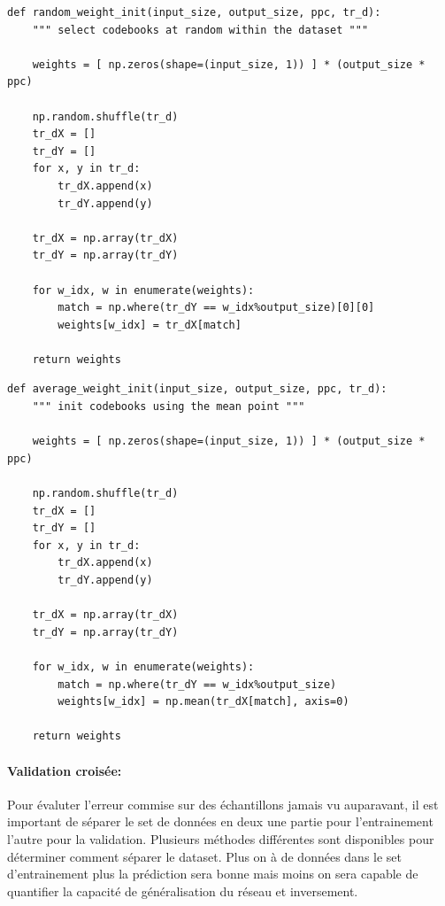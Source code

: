\documentclass[11pt]{article}
\begin{document}
\begin{lstlisting}
def random_weight_init(input_size, output_size, ppc, tr_d):
    """ select codebooks at random within the dataset """

    weights = [ np.zeros(shape=(input_size, 1)) ] * (output_size * ppc)

    np.random.shuffle(tr_d)
    tr_dX = []
    tr_dY = []
    for x, y in tr_d:
        tr_dX.append(x)
        tr_dY.append(y)

    tr_dX = np.array(tr_dX)
    tr_dY = np.array(tr_dY)

    for w_idx, w in enumerate(weights):
        match = np.where(tr_dY == w_idx%output_size)[0][0]
        weights[w_idx] = tr_dX[match]

    return weights
\end{lstlisting}

\begin{lstlisting}
def average_weight_init(input_size, output_size, ppc, tr_d):
    """ init codebooks using the mean point """

    weights = [ np.zeros(shape=(input_size, 1)) ] * (output_size * ppc)

    np.random.shuffle(tr_d)
    tr_dX = []
    tr_dY = []
    for x, y in tr_d:
        tr_dX.append(x)
        tr_dY.append(y)

    tr_dX = np.array(tr_dX)
    tr_dY = np.array(tr_dY)

    for w_idx, w in enumerate(weights):
        match = np.where(tr_dY == w_idx%output_size)
        weights[w_idx] = np.mean(tr_dX[match], axis=0)

    return weights
\end{lstlisting}
\newpage



\paragraph{Validation crois\'ee:} Pour \'evaluter l'erreur commise sur des
\'echantillons jamais vu auparavant, il est
important de s\'eparer le set de donn\'ees en deux une partie pour l'entrainement
l'autre pour la validation. Plusieurs m\'ethodes diff\'erentes sont disponibles
pour d\'eterminer comment s\'eparer le dataset. Plus on \`a de donn\'ees dans le set
d'entrainement plus la pr\'ediction sera bonne mais moins on sera capable de
quantifier la capacit\'e de g\'en\'eralisation du r\'eseau et inversement.
\end{document}
